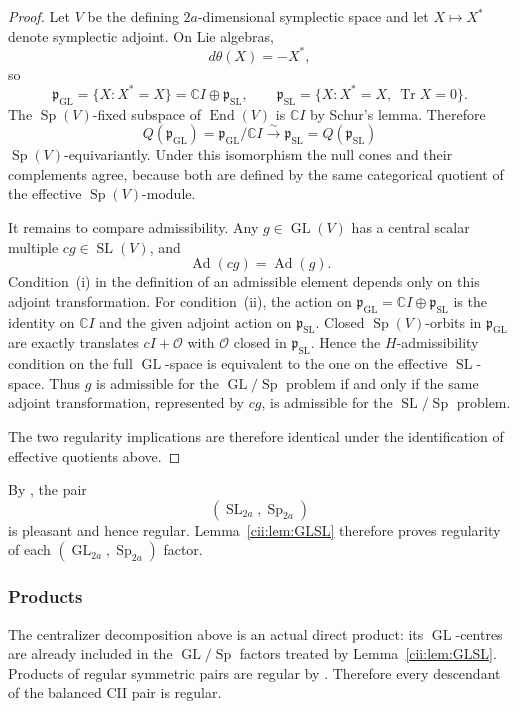 \documentclass[10pt,a4paper]{amsart}
\numberwithin{equation}{section}
\newcommand{\C}{\mathbb C}
\newcommand{\GL}{\operatorname{GL}}
\newcommand{\SL}{\operatorname{SL}}
\newcommand{\Sp}{\operatorname{Sp}}
\newcommand{\End}{\operatorname{End}}
\newcommand{\Ad}{\operatorname{Ad}}
\newcommand{\Tr}{\operatorname{Tr}}
\begin{document}
\begin{proof}
Let \(V\) be the defining \(2a\)-dimensional symplectic space and let
\(X\mapsto X^*\) denote symplectic adjoint.  On Lie algebras,
\[
  d\theta(X)=-X^*,
\]
so
\[
  \mathfrak p_{\GL}=\{X:X^*=X\}
  =\C I\oplus\mathfrak p_{\SL},
  \qquad
  \mathfrak p_{\SL}=\{X:X^*=X,\ \Tr X=0\}.
\]
The \(\Sp(V)\)-fixed subspace of \(\End(V)\) is \(\C I\) by Schur's
lemma.  Therefore
\[
  Q(\mathfrak p_{\GL})
  =\mathfrak p_{\GL}/\C I
  \xrightarrow{\sim}\mathfrak p_{\SL}
  =Q(\mathfrak p_{\SL})
\]
\(\Sp(V)\)-equivariantly.  Under this isomorphism the null cones and their
complements agree, because both are defined by the same categorical quotient
of the effective \(\Sp(V)\)-module.

It remains to compare admissibility.  Any \(g\in\GL(V)\) has a central
scalar multiple \(cg\in\SL(V)\), and
\[
  \Ad(cg)=\Ad(g).
\]
Condition~(i) in the definition of an admissible element
\cite[Definition~7.4.1]{AG09} depends only on this adjoint transformation.
For condition~(ii), the action on
\(\mathfrak p_{\GL}=\C I\oplus\mathfrak p_{\SL}\) is the identity on
\(\C I\) and the given adjoint action on \(\mathfrak p_{\SL}\).  Closed
\(\Sp(V)\)-orbits in \(\mathfrak p_{\GL}\) are exactly translates
\(cI+\mathcal O\) with \(\mathcal O\) closed in
\(\mathfrak p_{\SL}\).  Hence the \(H\)-admissibility condition on the
full \(\GL\)-space is equivalent to the one on the effective
\(\SL\)-space.  Thus \(g\) is admissible for the \(\GL/\Sp\) problem if
and only if the same adjoint transformation, represented by \(cg\), is
admissible for the \(\SL/\Sp\) problem.

The two regularity implications are therefore identical under the
identification of effective quotients above.
\end{proof}

By \cite[Proposition~4.14]{Rubio}, the pair
\[
  (\SL_{2a},\Sp_{2a})
\]
is pleasant and hence regular.  Lemma~\ref{cii:lem:GLSL} therefore proves
regularity of each \((\GL_{2a},\Sp_{2a})\) factor.

\subsubsection{Products}

The centralizer decomposition above is an actual direct product: its
\(\GL\)-centres are already included in the \(\GL/\Sp\) factors treated by
Lemma~\ref{cii:lem:GLSL}.  Products of regular symmetric pairs are regular by
\cite[Proposition~7.4.4]{AG09}.  Therefore every descendant of the balanced
CII pair is regular.
\end{document}
